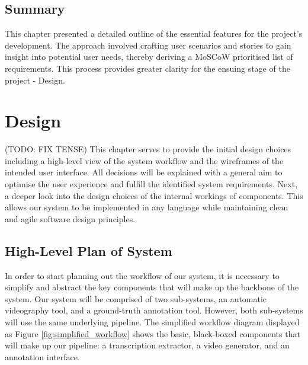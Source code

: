 \documentclass{l4proj}
\begin{document}
\section{Summary}
This chapter presented a detailed outline of the essential features for the project's development. The approach involved crafting user scenarios and stories to gain insight into potential user needs, thereby deriving a MoSCoW prioritised list of requirements. This process provides greater clarity for the ensuing stage of the project - Design.




\chapter{Design}
(TODO: FIX TENSE)
This chapter serves to provide the initial design choices including a high-level view of the system workflow and the wireframes of the intended user interface. All decisions will be explained with a general aim to optimise the user experience and fulfill the identified system requirements. Next, a deeper look into the design choices of the internal workings of components. This allows our system to be implemented in any language while maintaining clean and agile software design principles. 

\section{High-Level Plan of System}
In order to start planning out the workflow of our system, it is necessary to simplify and abstract the key components that will make up the backbone of the system. Our system will be comprised of two sub-systems, an automatic videography tool, and a ground-truth annotation tool. However, both sub-systems will use the same underlying pipeline. The simplified workflow diagram displayed as Figure \ref{fig:simplified_workflow} shows the basic, black-boxed components that will make up our pipeline: a transcription extractor, a video generator, and an annotation interface.
\end{document}
